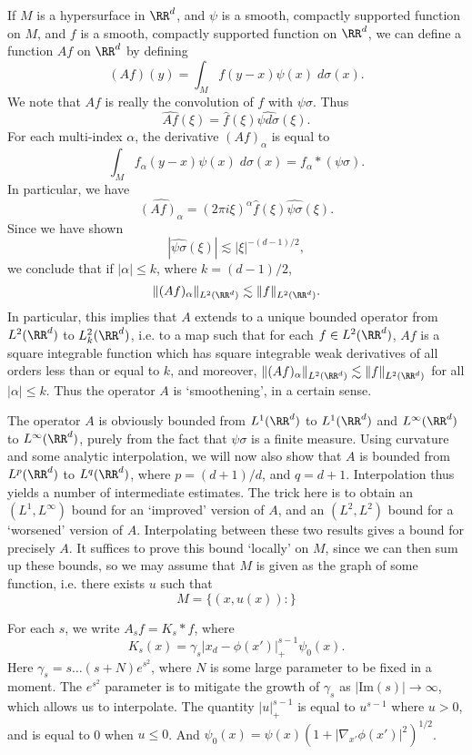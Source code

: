 \begin{example}
  If $M$ is a hypersurface in $\RR^d$, and $\psi$ is a smooth, compactly supported function on $M$, and $f$ is a smooth, compactly supported function on $\RR^d$, we can define a function $Af$ on $\RR^d$ by defining
  \[ (Af)(y) = \int_M f(y - x) \psi(x)\; d\sigma(x). \]
  We note that $Af$ is really the convolution of $f$ with $\psi \sigma$. Thus
  \[ \widehat{Af}(\xi) = \widehat{f}(\xi) \widehat{\psi d\sigma}(\xi). \]
  For each multi-index $\alpha$, the derivative $(Af)_\alpha$ is equal to
  \[ \int_M f_\alpha(y-x) \psi(x)\; d\sigma(x) = f_\alpha * (\psi \sigma). \]
  In particular, we have
  \[ \widehat{(Af)_\alpha} = (2 \pi i \xi)^\alpha \widehat{f}(\xi) \widehat{\psi \sigma}(\xi). \]
  Since we have shown
  \[ |\widehat{\psi \sigma}(\xi)| \lesssim |\xi|^{-(d-1)/2}, \]
  we conclude that if $|\alpha| \leq k$, where $k = (d-1)/2$,
  \[ \| (Af)_\alpha \|_{L^2(\RR^d)} \lesssim \| f \|_{L^2(\RR^d)}. \]
  In particular, this implies that $A$ extends to a unique bounded operator from $L^2(\RR^d)$ to $L^2_k(\RR^d)$, i.e. to a map such that for each $f \in L^2(\RR^d)$, $Af$ is a square integrable function which has square integrable weak derivatives of all orders less than or equal to $k$, and moreover, $\| (Af)_\alpha \|_{L^2(\RR^d)} \lesssim \| f \|_{L^2(\RR^d)}$ for all $|\alpha| \leq k$. Thus the operator $A$ is `smoothening', in a certain sense.

  The operator $A$ is obviously bounded from $L^1(\RR^d)$ to $L^1(\RR^d)$ and $L^\infty(\RR^d)$ to $L^\infty(\RR^d)$, purely from the fact that $\psi \sigma$ is a finite measure. Using curvature and some analytic interpolation, we will now also show that $A$ is bounded from $L^p(\RR^d)$ to $L^q(\RR^d)$, where $p = (d+1)/d$, and $q = d+1$. Interpolation thus yields a number of intermediate estimates. The trick here is to obtain an $(L^1,L^\infty)$ bound for an `improved' version of $A$, and an $(L^2,L^2)$ bound for a `worsened' version of $A$. Interpolating between these two results gives a bound for precisely $A$. It suffices to prove this bound `locally' on $M$, since we can then sum up these bounds, so we may assume that $M$ is given as the graph of some function, i.e. there exists $u$ such that
  \[ M = \{ (x,u(x)):  \} \]


  For each $s$, we write $A_sf = K_s * f$, where
  \[ K_s(x) = \gamma_s |x_d - \phi(x')|_+^{s-1} \psi_0(x). \]
  Here $\gamma_s = s \dots (s + N) e^{s^2}$, where $N$ is some large parameter to be fixed in a moment. The $e^{s^2}$ parameter is to mitigate the growth of $\gamma_s$ as $|\text{Im}(s)| \to \infty$, which allows us to interpolate. The quantity $|u|_+^{s-1}$ is equal to $u^{s-1}$ where $u > 0$, and is equal to 0 when $u \leq 0$. And $\psi_0(x) = \psi(x) (1 + |\nabla_{x'} \phi(x')|^2)^{1/2}$.
\end{example}





